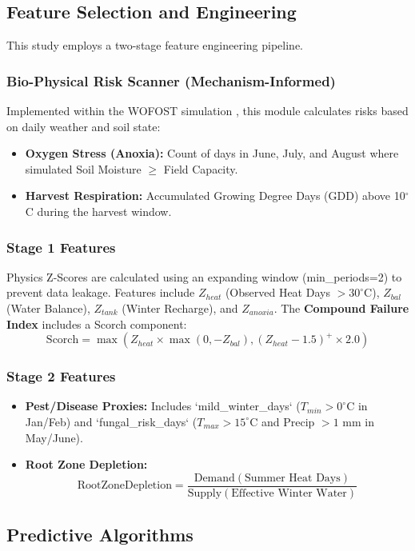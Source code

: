 \subsection{Feature Selection and Engineering}
This study employs a two-stage feature engineering pipeline.

\subsubsection{Bio-Physical Risk Scanner (Mechanism-Informed)}
Implemented within the WOFOST simulation \cite{boogaard1998wofost}, this module calculates risks based on daily weather and soil state:
\begin{itemize}
    \item \textbf{Oxygen Stress (Anoxia):} Count of days in June, July, and August where simulated Soil Moisture $\ge$ Field Capacity.
    \item \textbf{Harvest Respiration:} Accumulated Growing Degree Days (GDD) above 10$^\circ$C during the harvest window.
\end{itemize}

\subsubsection{Stage 1 Features}
Physics Z-Scores are calculated using an expanding window (min\_periods=2) to prevent data leakage. Features include $Z_{heat}$ (Observed Heat Days $> 30^\circ$C), $Z_{bal}$ (Water Balance), $Z_{tank}$ (Winter Recharge), and $Z_{anoxia}$.
The \textbf{Compound Failure Index} includes a Scorch component:
\[ \text{Scorch} = \max\left(Z_{heat} \times \max(0, -Z_{bal}), \left(Z_{heat} - 1.5\right)^+\times 2.0\right) \]

\subsubsection{Stage 2 Features}
\begin{itemize}
    \item \textbf{Pest/Disease Proxies:} Includes `mild\_winter\_days` ($T_{min} > 0^\circ$C in Jan/Feb) and `fungal\_risk\_days` ($T_{max} > 15^\circ$C and Precip $> 1$ mm in May/June).
    \item \textbf{Root Zone Depletion:}
    \[ \text{RootZoneDepletion} = \frac{\text{Demand} (\text{Summer Heat Days})}{\text{Supply} (\text{Effective Winter Water})} \]
\end{itemize}

\subsection{Predictive Algorithms}

